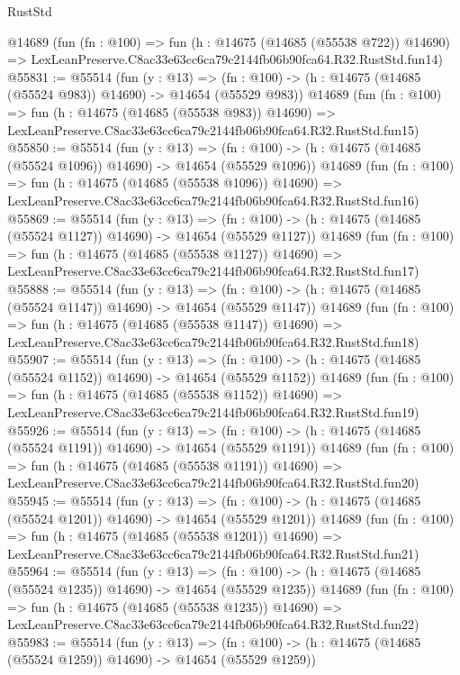 \begin{lexlean}{RustStd}
\begin{coremodule}
    @14689
    (fun (fn : @100) =>
    fun (h : @14675 (@14685 (@55538 @722)) @14690) =>
    LexLeanPreserve.C8ac33e63cc6ca79c2144fb06b90fca64.R32.RustStd.fun14)
@55831 := @55514
    (fun (y : @13) =>
    (fn : @100) -> (h : @14675 (@14685 (@55524 @983)) @14690) -> @14654 (@55529 @983))
    @14689
    (fun (fn : @100) =>
    fun (h : @14675 (@14685 (@55538 @983)) @14690) =>
    LexLeanPreserve.C8ac33e63cc6ca79c2144fb06b90fca64.R32.RustStd.fun15)
@55850 := @55514
    (fun (y : @13) =>
    (fn : @100) -> (h : @14675 (@14685 (@55524 @1096)) @14690) -> @14654 (@55529 @1096))
    @14689
    (fun (fn : @100) =>
    fun (h : @14675 (@14685 (@55538 @1096)) @14690) =>
    LexLeanPreserve.C8ac33e63cc6ca79c2144fb06b90fca64.R32.RustStd.fun16)
@55869 := @55514
    (fun (y : @13) =>
    (fn : @100) -> (h : @14675 (@14685 (@55524 @1127)) @14690) -> @14654 (@55529 @1127))
    @14689
    (fun (fn : @100) =>
    fun (h : @14675 (@14685 (@55538 @1127)) @14690) =>
    LexLeanPreserve.C8ac33e63cc6ca79c2144fb06b90fca64.R32.RustStd.fun17)
@55888 := @55514
    (fun (y : @13) =>
    (fn : @100) -> (h : @14675 (@14685 (@55524 @1147)) @14690) -> @14654 (@55529 @1147))
    @14689
    (fun (fn : @100) =>
    fun (h : @14675 (@14685 (@55538 @1147)) @14690) =>
    LexLeanPreserve.C8ac33e63cc6ca79c2144fb06b90fca64.R32.RustStd.fun18)
@55907 := @55514
    (fun (y : @13) =>
    (fn : @100) -> (h : @14675 (@14685 (@55524 @1152)) @14690) -> @14654 (@55529 @1152))
    @14689
    (fun (fn : @100) =>
    fun (h : @14675 (@14685 (@55538 @1152)) @14690) =>
    LexLeanPreserve.C8ac33e63cc6ca79c2144fb06b90fca64.R32.RustStd.fun19)
@55926 := @55514
    (fun (y : @13) =>
    (fn : @100) -> (h : @14675 (@14685 (@55524 @1191)) @14690) -> @14654 (@55529 @1191))
    @14689
    (fun (fn : @100) =>
    fun (h : @14675 (@14685 (@55538 @1191)) @14690) =>
    LexLeanPreserve.C8ac33e63cc6ca79c2144fb06b90fca64.R32.RustStd.fun20)
@55945 := @55514
    (fun (y : @13) =>
    (fn : @100) -> (h : @14675 (@14685 (@55524 @1201)) @14690) -> @14654 (@55529 @1201))
    @14689
    (fun (fn : @100) =>
    fun (h : @14675 (@14685 (@55538 @1201)) @14690) =>
    LexLeanPreserve.C8ac33e63cc6ca79c2144fb06b90fca64.R32.RustStd.fun21)
@55964 := @55514
    (fun (y : @13) =>
    (fn : @100) -> (h : @14675 (@14685 (@55524 @1235)) @14690) -> @14654 (@55529 @1235))
    @14689
    (fun (fn : @100) =>
    fun (h : @14675 (@14685 (@55538 @1235)) @14690) =>
    LexLeanPreserve.C8ac33e63cc6ca79c2144fb06b90fca64.R32.RustStd.fun22)
@55983 := @55514
    (fun (y : @13) =>
    (fn : @100) -> (h : @14675 (@14685 (@55524 @1259)) @14690) -> @14654 (@55529 @1259))

\end{coremodule}
\end{lexlean}
